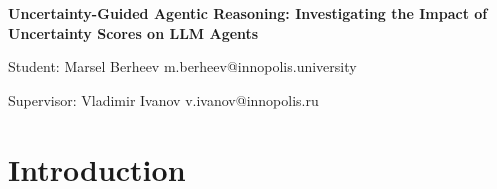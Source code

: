 \documentclass[11pt,a4paper]{article}
\makeatletter
\newcommand{\ProposalTitle}{
    Uncertainty-Guided Agentic Reasoning: Investigating the Impact of Uncertainty Scores on LLM Agents
}
\newcommand{\StudentName}{
    Marsel Berheev m.berheev@innopolis.university
}
\newcommand{\SupervisorName}{
    Vladimir Ivanov  v.ivanov@innopolis.ru 
}
\makeatother
\begin{document}

\begin{center}
    {\LARGE\bfseries \ProposalTitle\par}

    \vspace{1.2em}

    {\large Student: \StudentName\par}

    \vspace{0.3em}

    {\large Supervisor: \SupervisorName\par}
\end{center}

\vspace{1.2em}


\begin{abstract}
Current agentic systems demonstrate outstanding performance among various types of tasks,
including code generation and validation. However due to probabilistic nature of models
and inconsistency in dateset quality, Large Language Models (LLMs), tend to hallucinate,
generating structurally correct, but logically wrong code snippets. Hallucination detections methods
vary in their methodology, however one specific subset stands out among others. Present papers demonstrated
ability of hidden states to store information about models awareness of hallucinated samples. Using this 
insights it is possible to detect, but not affect generation of hallucinations. In this paper we plan to
investigate performance of hallucination aware agentic loops. Resulting system will not only be
able to detect hallucinated samples, but also apply this knowledge for generation of correct code.
\end{abstract}


\section{Introduction}



\end{document}
